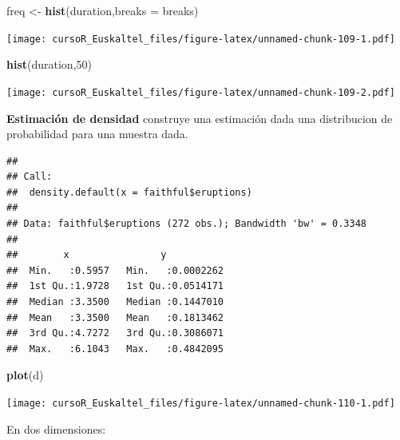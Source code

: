 \documentclass[]{book}
\newenvironment{Shaded}{\begin{snugshade}}{\end{snugshade}}
\newcommand{\KeywordTok}[1]{\textcolor[rgb]{0.13,0.29,0.53}{\textbf{#1}}}
\newcommand{\DataTypeTok}[1]{\textcolor[rgb]{0.13,0.29,0.53}{#1}}
\newcommand{\DecValTok}[1]{\textcolor[rgb]{0.00,0.00,0.81}{#1}}
\newcommand{\StringTok}[1]{\textcolor[rgb]{0.31,0.60,0.02}{#1}}
\newcommand{\OperatorTok}[1]{\textcolor[rgb]{0.81,0.36,0.00}{\textbf{#1}}}
\newcommand{\NormalTok}[1]{#1}
\begin{document}
\begin{Shaded}
\begin{Highlighting}[]
\NormalTok{freq <-}\StringTok{ }\KeywordTok{hist}\NormalTok{(duration,}\DataTypeTok{breaks =}\NormalTok{ breaks)}
\end{Highlighting}
\end{Shaded}

\texttt{[image: cursoR\_Euskaltel\_files/figure-latex/unnamed-chunk-109-1.pdf]}

\begin{Shaded}
\begin{Highlighting}[]
\KeywordTok{hist}\NormalTok{(duration,}\DecValTok{50}\NormalTok{)}
\end{Highlighting}
\end{Shaded}

\texttt{[image: cursoR\_Euskaltel\_files/figure-latex/unnamed-chunk-109-2.pdf]}

\textbf{Estimación de densidad} construye una estimación dada una
distribucion de probabilidad para una muestra dada.

\begin{Shaded}
\end{Shaded}

\begin{verbatim}
## 
## Call:
##  density.default(x = faithful$eruptions)
## 
## Data: faithful$eruptions (272 obs.); Bandwidth 'bw' = 0.3348
## 
##        x                y            
##  Min.   :0.5957   Min.   :0.0002262  
##  1st Qu.:1.9728   1st Qu.:0.0514171  
##  Median :3.3500   Median :0.1447010  
##  Mean   :3.3500   Mean   :0.1813462  
##  3rd Qu.:4.7272   3rd Qu.:0.3086071  
##  Max.   :6.1043   Max.   :0.4842095
\end{verbatim}

\begin{Shaded}
\begin{Highlighting}[]
\KeywordTok{plot}\NormalTok{(d)}
\end{Highlighting}
\end{Shaded}

\texttt{[image: cursoR\_Euskaltel\_files/figure-latex/unnamed-chunk-110-1.pdf]}

En dos dimensiones:
\end{document}
